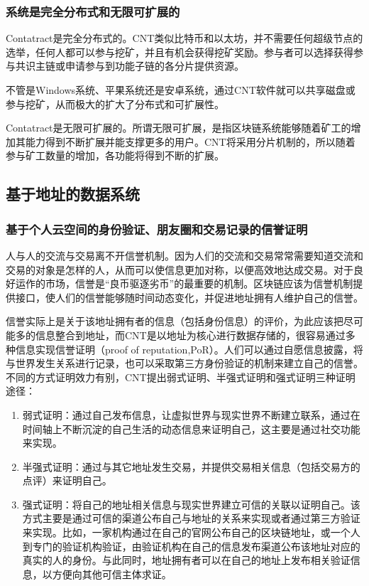 \documentclass[a4paper,12pt]{article}
\begin{document}
\subsubsection{系统是完全分布式和无限可扩展的}

Contatract是完全分布式的。CNT类似比特币和以太坊，并不需要任何超级节点的选举，任何人都可以参与挖矿，并且有机会获得挖矿奖励。参与者可以选择获得参与共识主链或申请参与到功能子链的各分片提供资源。

不管是Windows系统、平果系统还是安卓系统，通过CNT软件就可以共享磁盘或参与挖矿，从而极大的扩大了分布式和可扩展性。

Contatract是无限可扩展的。所谓无限可扩展，是指区块链系统能够随着矿工的增加其能力得到不断扩展并能支撑更多的用户。CNT将采用分片机制的，所以随着参与矿工数量的增加，各功能将得到不断的扩展。

\subsection{基于地址的数据系统}

\subsubsection{基于个人云空间的身份验证、朋友圈和交易记录的信誉证明}

人与人的交流与交易离不开信誉机制。因为人们的交流和交易常常需要知道交流和交易的对象是怎样的人，从而可以使信息更加对称，以便高效地达成交易。对于良好运作的市场，信誉是“良币驱逐劣币”的最重要的机制。区块链应该为信誉机制提供接口，使人们的信誉能够随时间动态变化，并促进地址拥有人维护自己的信誉。

信誉实际上是关于该地址拥有者的信息（包括身份信息）的评价，为此应该把尽可能多的信息整合到地址，而CNT是以地址为核心进行数据存储的，很容易通过多种信息实现信誉证明（proof of reputation,PoR）。人们可以通过自愿信息披露，将与世界发生关系进行记录，也可以采取第三方身份验证的机制来建立自己的信誉。不同的方式证明效力有别，CNT提出弱式证明、半强式证明和强式证明三种证明途径：

\begin{enumerate}
\item 弱式证明：通过自己发布信息，让虚拟世界与现实世界不断建立联系，通过在时间轴上不断沉淀的自己生活的动态信息来证明自己，这主要是通过社交功能来实现。
\item 半强式证明：通过与其它地址发生交易，并提供交易相关信息（包括交易方的点评）来证明自己。
\item 强式证明：将自己的地址相关信息与现实世界建立可信的关联以证明自己。该方式主要是通过可信的渠道公布自己与地址的关系来实现或者通过第三方验证来实现。比如，一家机构通过在自己的官网公布自己的区块链地址，或一个人到专门的验证机构验证，由验证机构在自己的信息发布渠道公布该地址对应的真实的人的身份。与此同时，地址拥有者可以在自己的地址上发布相关验证信息，以方便向其他可信主体求证。
\end{enumerate}
\end{document}
